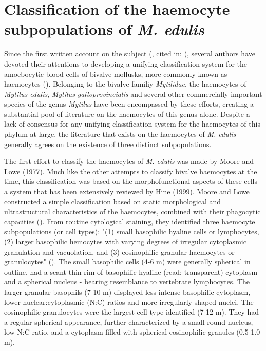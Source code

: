 \section{Classification of the haemocyte subpopulations of \emph{M. edulis}}
\label{subsection:haemocyte_classification}
Since the first written account on the subject (\cite{Cuenot1891}, cited in: \cite{Cheng1980}), several authors have devoted their attentions to developing a unifying classification system for the amoebocytic blood cells of bivalve mollusks, more commonly known as haemocytes (\cite{Cheng1980, delaBallina2022}). Belonging to the bivalve familiy \emph{Mytilidae}, the haemocytes of \emph{Mytilus edulis}, \emph{Mytilus galloprovincialis} and several other commercially important species of the genus \emph{Mytilus} have been encompassed by these efforts, creating a substantial pool of literature on the haemocytes of this genus alone. Despite a lack of consensus for any unifying classification system for the haemocytes of this phylum at large, the literature that exists on the haemocytes of \emph{M. edulis} generally agrees on the existence of three distinct subpopulations.

The first effort to classify the haemocytes of \emph{M. edulis} was made by Moore and Lowe (1977). Much like the other attempts to classify bivalve haemocytes at the time, this classification was based on the morphofunctional aspects of these cells - a system that has been extensively reviewed by Hine (1999). Moore and Lowe constructed a simple classification based on static morphological and ultrastructural characteristics of the haemocytes, combined with their phagocytic capacities (\cite{Moore1977}). From routine cytological staining, they identified three haemocyte subpopulations (or cell types): "(1) small basophilic hyaline cells or lymphocytes, (2) larger basophilic hemocytes with varying degrees of irregular cytoplasmic granulation and vacuolation, and (3) eosinophilic granular haemocytes or granulocytes" (\cite{Moore1977}). The small basophilic cells (4-6 \micro m) were generally spherical in outline, had a scant thin rim of basophilic hyaline (read: transparent) cytoplasm and a spherical nucleus - bearing resemblance to vertebrate lymphocytes. The larger granular basophils (7-10 \micro m) displayed less intense basophilic cytoplasm, lower nuclear:cytoplasmic (N:C) ratios and more irregularly shaped nuclei. The eosinophilic granulocytes were the largest cell type identified (7-12 \micro m). They had a regular spherical appearance, further characterized by a small round nucleus, low N:C ratio, and a cytoplasm filled with spherical eosinophilic granules (0.5-1.0 \micro m).


